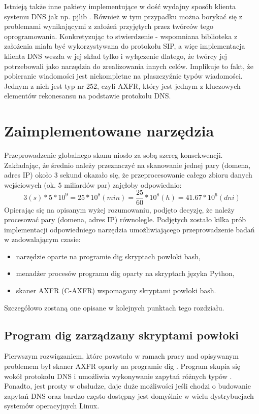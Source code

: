 Istnieją także inne pakiety implementujące w dość wydajny sposób klienta systemu DNS jak np. pjlib \cite{pjlib}. Również w tym
przypadku można borykać się z problemami wynikającymi z założeń przyjętych przez twórców tego oprogramowania. Konkretyzując to
stwierdzenie - wspomniana biblioteka z założenia miała być wykorzystywana do protokołu SIP, a więc implementacja klienta DNS
weszła w jej skład tylko i wyłączenie dlatego, że twórcy jej potrzebowali jako narzędzia do zrealizowania innych celów.
Implikuje to fakt, że pobieranie wiadomości jest niekompletne na płaszczyźnie typów wiadomości. Jednym z nich jest typ nr 252,
czyli AXFR, który jest jednym z kluczowych elementów rekonesansu na podstawie protokołu DNS.

\section{Zaimplementowane narzędzia}
Przeprowadzenie globalnego skanu niosło za sobą szereg konsekwencji. Zakładając, że średnio należy przeznaczyć na skanowanie
jednej pary (domena, adres IP) około 3 sekund okazało się, że przeprocesowanie całego zbioru danych wejściowych (ok. 5 miliardów
par) zajęłoby odpowiednio:
$$3(s) * 5 * 10^{9} = 25 * 10^{8}(min) = \frac{25}{60} * 10^{8}(h) = 41.67 * 10^{6} (dni)\label{obliczenia}$$
Opierając się na opisanym wyżej rozumowaniu, podjęto decyzję, że należy procesować pary (domena, adres IP) równolegle.
Podjętych zostało kilka prób implementacji odpowiedniego narzędzia umożliwiającego przeprowadzenie badań w zadowalającym czasie:
\begin{itemize}
	\item narzędzie oparte na programie dig skryptach powłoki bash,
	\item menadżer procesów programu dig oparty na skryptach języka Python,
	\item skaner AXFR (C-AXFR) wspomagany skryptami powłoki bash.
\end{itemize}
Szczegółowo zostaną one opisane w kolejnych punktach tego rozdziału.

\subsection{Program dig zarządzany skryptami powłoki}
\label{dig_sh}
Pierwszym rozwiązaniem, które powstało w ramach pracy nad opisywanym problemem był skaner AXFR oparty na programie
dig \cite{isc}. Program skupia się wokół protokołu DNS i umożliwia wykonywanie zapytań różnych typów \cite{Liu:2006:DB:1197828}.
Ponadto, jest prosty w obsłudze, daje duże możliwości jeśli chodzi o budowanie zapytań DNS oraz bardzo często dostępny jest
domyślnie w wielu dystrybucjach systemów operacyjnych Linux.

